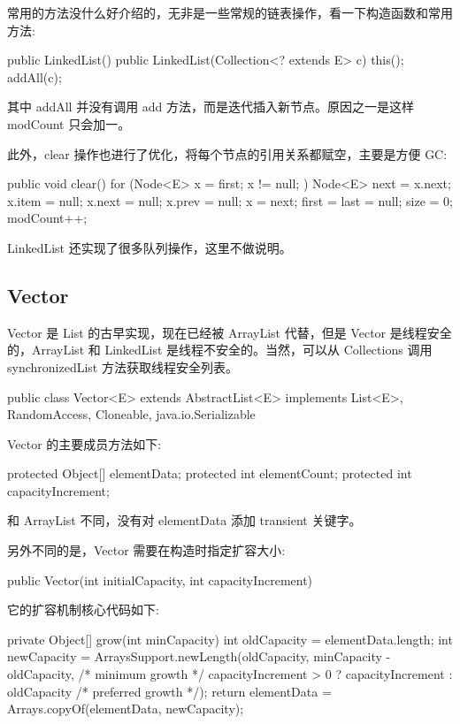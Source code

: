 常用的方法没什么好介绍的，无非是一些常规的链表操作，看一下构造函数和常用方法:

\begin{Java}
public LinkedList() { }
public LinkedList(Collection<? extends E> c) {
    this();
    addAll(c);
}
\end{Java}

其中 addAll 并没有调用 add 方法，而是迭代插入新节点。原因之一是这样 modCount 只会加一。

此外，clear 操作也进行了优化，将每个节点的引用关系都赋空，主要是方便 GC:

\begin{Java}
public void clear() {
    for (Node<E> x = first; x != null; ) {
        Node<E> next = x.next;
        x.item = null;
        x.next = null;
        x.prev = null;
        x = next;
    }
    first = last = null;
    size = 0;
    modCount++;
}
\end{Java}

LinkedList 还实现了很多队列操作，这里不做说明。

\subsection{Vector}

Vector 是 List 的古早实现，现在已经被 ArrayList 代替，但是 Vector 是线程安全的，ArrayList 和 LinkedList 是线程不安全的。当然，可以从 Collections 调用 synchronizedList 方法获取线程安全列表。

\begin{Java}
public class Vector<E> extends AbstractList<E> implements List<E>, RandomAccess, Cloneable, java.io.Serializable
\end{Java}

Vector 的主要成员方法如下:
\begin{Java}
protected Object[] elementData;
protected int elementCount;
protected int capacityIncrement;
\end{Java}

和 ArrayList 不同，没有对 elementData 添加 transient 关键字。

另外不同的是，Vector 需要在构造时指定扩容大小:

\begin{Java}
public Vector(int initialCapacity, int capacityIncrement)
\end{Java}

它的扩容机制核心代码如下:

\begin{Java}
private Object[] grow(int minCapacity) {
    int oldCapacity = elementData.length;
    int newCapacity = ArraysSupport.newLength(oldCapacity,
            minCapacity - oldCapacity, /* minimum growth */
            capacityIncrement > 0 ? capacityIncrement : oldCapacity
                                       /* preferred growth */);
    return elementData = Arrays.copyOf(elementData, newCapacity);
}
\end{Java}

